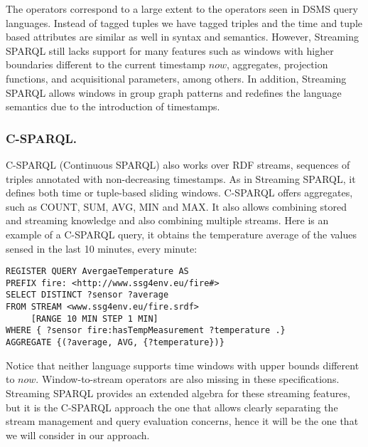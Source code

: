 The operators correspond to a large extent to the operators seen in DSMS query languages. %
Instead of tagged tuples we have tagged triples and the time and tuple based attributes are similar as well in syntax
and semantics. However, Streaming SPARQL still lacks support for many features such as windows with higher boundaries
different to the current timestamp $now$, aggregates, projection functions, and acquisitional parameters, among others.
In addition, Streaming SPARQL allows windows in group graph patterns and redefines the language semantics due to the
introduction of timestamps.

\subsubsection{C-SPARQL.} C-SPARQL (Continuous SPARQL) \cite{Barbieri_2010} also works over RDF streams, sequences of triples annotated with non-decreasing timestamps. As in Streaming SPARQL, it defines both time or tuple-based sliding windows. C-SPARQL offers aggregates, such as \textsf{COUNT, SUM, AVG, MIN} and \textsf{MAX}. It also allows combining stored and streaming knowledge and also combining multiple streams. Here is an example of a C-SPARQL query, it obtains the temperature average of the values sensed in the last 10 minutes, every minute:

\begin{lstlisting}[style=SPARQLSTRStyle,language=SPARQLSTR,frame=none]
REGISTER QUERY AvergaeTemperature AS
PREFIX fire: <http://www.ssg4env.eu/fire#>
SELECT DISTINCT ?sensor ?average
FROM STREAM <www.ssg4env.eu/fire.srdf> 
     [RANGE 10 MIN STEP 1 MIN]
WHERE { ?sensor fire:hasTempMeasurement ?temperature .}
AGGREGATE {(?average, AVG, {?temperature})}
\end{lstlisting}

Notice that neither language supports time windows with upper bounds different to $now$. Window-to-stream operators are
also missing in these specifications. Streaming SPARQL provides an extended algebra for these streaming features, but
it is the C-SPARQL approach the one that allows clearly separating the stream management and query evaluation concerns,
hence it will be the one that we will consider in our approach.
